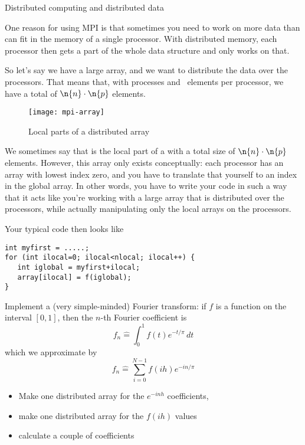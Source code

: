 
 {Distributed computing and distributed data}

One reason for using MPI is that sometimes you need to work on
more data than can fit in the memory of a single processor.
With distributed memory, each processor then gets a part
of the whole data structure and only works on that.

So let's say we have a large array, and we want to
distribute the data over the processors.
That means that, with  processes and ~elements
per processor, we have a total of $\n{n}\cdot\n{p}$ elements.

\begin{figure}[ht]
  \texttt{[image: mpi-array]}
  \caption{Local parts of a distributed array}
  \label{fig:mpi-array}
\end{figure}

We sometimes say that  is the local part
of a  with a total size of
$\n{n}\cdot\n{p}$ elements.
However, this array only exists
conceptually: each processor has an array with lowest index zero,
and you have to translate that yourself to an index in the global
array.
In other words, you have to write your code in such a way that
it acts like you're working with a large array that is distributed
over the processors, while
actually manipulating only the local arrays on the processors.

Your typical code then looks like

\lstset{style=reviewcode,language=C} %
\begin{lstlisting}
int myfirst = .....;
for (int ilocal=0; ilocal<nlocal; ilocal++) {
   int iglobal = myfirst+ilocal;
   array[ilocal] = f(iglobal);
}
\end{lstlisting}

\begin{exercise}
  \label{ex:fft-vector}
  Implement a (very simple-minded) Fourier transform: if $f$ is a
  function on the interval $[0,1]$, then the $n$-th Fourier
  coefficient is
  \[ f_n\hat = \int_0^1 f(t)e^{-t/\pi}\,dt \]
  which we approximate by
  \[ f_n\hat = \sum_{i=0}^{N-1} f(ih)e^{-in/\pi} \]
  \begin{itemize}
  \item Make one distributed array for the $e^{-inh}$ coefficients,
  \item make one distributed array for the $f(ih)$ values
  \item calculate a couple of coefficients
  \end{itemize}
\end{exercise}

